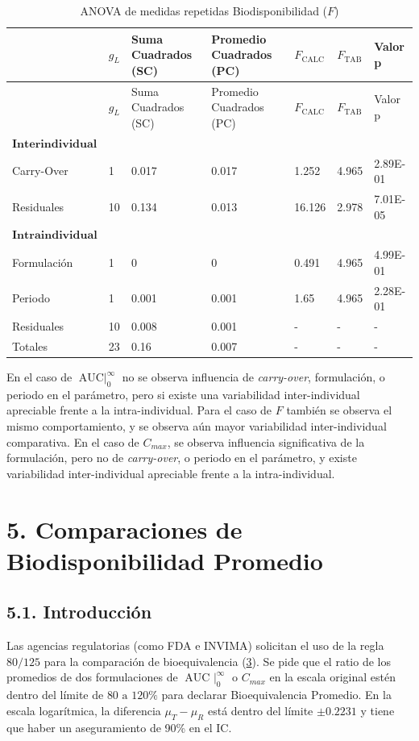\documentclass[]{article}
\begin{document}
\begin{longtable}[]{@{}lllllll@{}}
\caption{ANOVA de medidas repetidas Biodisponibilidad
(\(F\))}\tabularnewline
\toprule
& \(g_{L}\) & Suma Cuadrados (SC) & Promedio Cuadrados (PC) &
\(F_{\textrm{CALC}}\) & \(F_{\textrm{TAB}}\) & Valor p\tabularnewline
\midrule
\endfirsthead
\toprule
& \(g_{L}\) & Suma Cuadrados (SC) & Promedio Cuadrados (PC) &
\(F_{\textrm{CALC}}\) & \(F_{\textrm{TAB}}\) & Valor p\tabularnewline
\midrule
\endhead
\(\mathbf{\textrm{Interindividual}}\) & & & & & &\tabularnewline
Carry-Over & 1 & 0.017 & 0.017 & 1.252 & 4.965 & 2.89E-01\tabularnewline
Residuales & 10 & 0.134 & 0.013 & 16.126 & 2.978 &
7.01E-05\tabularnewline
\(\mathbf{\textrm{Intraindividual}}\) & & & & & &\tabularnewline
Formulación & 1 & 0 & 0 & 0.491 & 4.965 & 4.99E-01\tabularnewline
Periodo & 1 & 0.001 & 0.001 & 1.65 & 4.965 & 2.28E-01\tabularnewline
Residuales & 10 & 0.008 & 0.001 & - & - & -\tabularnewline
Totales & 23 & 0.16 & 0.007 & - & - & -\tabularnewline
\bottomrule
\end{longtable}

En el caso de \(\textrm{AUC}\mid _{0}^{\infty}\) no se observa
influencia de \emph{carry-over}, formulación, o periodo en el parámetro,
pero si existe una variabilidad inter-individual apreciable frente a la
intra-individual. Para el caso de \(F\) también se observa el mismo
comportamiento, y se observa aún mayor variabilidad inter-individual
comparativa. En el caso de \(C_{max}\), se observa influencia
significativa de la formulación, pero no de \emph{carry-over}, o periodo
en el parámetro, y existe variabilidad inter-individual apreciable
frente a la intra-individual.

\section{5. Comparaciones de Biodisponibilidad
Promedio}\label{comparaciones-de-biodisponibilidad-promedio}

\subsection{5.1. Introducción}\label{introduccion-1}

Las agencias regulatorias (como FDA e INVIMA) solicitan el uso de la
regla \(80/125\) para la comparación de bioequivalencia
(\protect\hyperlink{ref-WorldHealthOrganization2006}{3}). Se pide que el
ratio de los promedios de dos formulaciones de
\(\textrm{AUC }\mid_{0}^{\infty}\) o \(C_{max}\) en la escala original
estén dentro del límite de \(80\textrm{ a }120\%\) para declarar
Bioequivalencia Promedio. En la escala logarítmica, la diferencia
\(\mu_{T}-\mu_{R}\) está dentro del límite \(\pm 0.2231\) y tiene que
haber un aseguramiento de 90\% en el IC.
\end{document}
